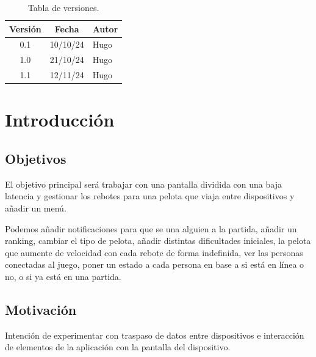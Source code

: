 \documentclass[a4paper,openright,12pt]{article}
\begin{document}

\tableofcontents

\vspace{5cm}

\begin{flushright}
\begin{table}[hbtp]
\begin{center}

\caption{Tabla de versiones.}
\label{tabla:versiones}
\small
\vspace{1ex}

\begin{tabular}{|c|c|l|}
\hline
Versión & Fecha & Autor \\
\hline \hline
0.1 & 10/10/24 & Hugo\\ \hline
1.0 & 21/10/24 & Hugo\\ \hline
1.1 & 12/11/24 & Hugo\\ \hline

\end{tabular}

\end{center}
\end{table}
\end{flushright}

\newpage
{}


\section{Introducción}\label{cap.introduccion}

\subsection{Objetivos}
El objetivo principal será trabajar con una pantalla dividida con una baja latencia y gestionar los rebotes para una pelota que viaja entre dispositivos y añadir un menú.

Podemos añadir notificaciones para que se una alguien a la partida, añadir un ranking, cambiar el tipo de pelota, añadir distintas dificultades iniciales, la pelota que aumente de velocidad con cada rebote de forma indefinida, ver las personas conectadas al juego, poner un estado a cada persona en base a si está en línea o no, o si ya está en una partida.
\subsection{Motivación}
Intención de experimentar con traspaso de datos entre dispositivos e interacción de elementos de la aplicación con la pantalla del dispositivo.
\end{document}
